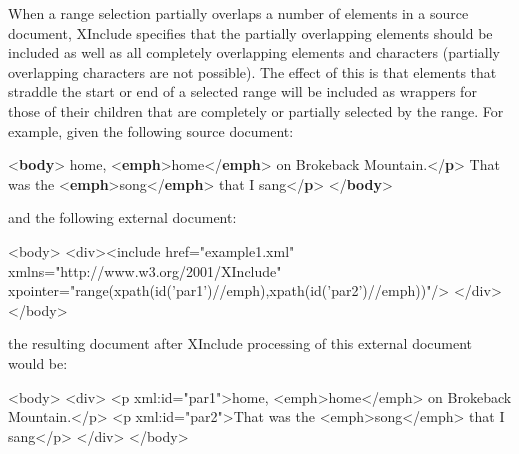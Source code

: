 When a range selection partially overlaps a number of elements in a source document, XInclude specifies that the partially overlapping elements should be included as well as all completely overlapping elements and characters (partially overlapping characters are not possible). The effect of this is that elements that straddle the start or end of a selected range will be included as wrappers for those of their children that are completely or partially selected by the range. For example, given the following source document: \par\bgroup{}\exampleFont \begin{shaded}\noindent\mbox{}{<\textbf{body}>}\mbox{}\newline 
{}home, {<\textbf{emph}>}home{</\textbf{emph}>} on Brokeback Mountain.{</\textbf{p}>}\mbox{}\newline 
{}That was the {<\textbf{emph}>}song{</\textbf{emph}>} that I sang{</\textbf{p}>}\mbox{}\newline 
{</\textbf{body}>}\end{shaded}\egroup\par \noindent  and the following external document: \par\hfill\bgroup\exampleFont\vskip 10pt\begin{shaded}
\obeyspaces   <body>\newline
     <div><include href="example1.xml" xmlns="http://www.w3.org/2001/XInclude"\newline
xpointer="range(xpath(id('par1')//emph),xpath(id('par2')//emph))"/>\newline
     </div>\newline
 </body>   \end{shaded}
\par\egroup 
 the resulting document after XInclude processing of this external document would be: \par\hfill\bgroup\exampleFont\vskip 10pt\begin{shaded}
\obeyspaces    <body>\newline
   <div>\newline
     <p xml:id="par1">home, <emph>home</emph> on Brokeback Mountain.</p>\newline
     <p xml:id="par2">That was the <emph>song</emph> that I sang</p>\newline
   </div>\newline
   </body>\end{shaded}
